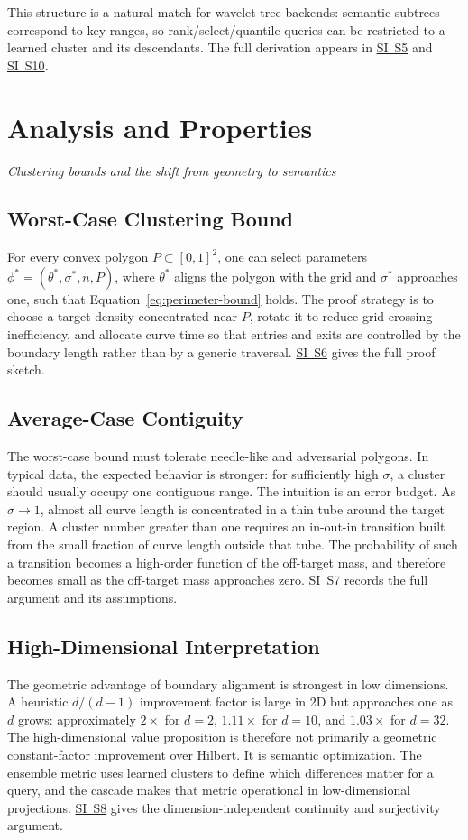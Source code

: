 \documentclass[11pt]{article}
\newcommand{\sectionsubtitle}[1]{\vspace{-0.25em}\noindent\textit{#1}\par\vspace{0.75em}}
\begin{document}
This structure is a natural match for wavelet-tree backends: semantic subtrees correspond to key ranges, so rank/select/quantile queries can be restricted to a learned cluster and its descendants. The full derivation appears in \hyperref[sec:si-composite-key]{SI~S5} and \hyperref[sec:si-wavelet]{SI~S10}.

\section{Analysis and Properties}
\label{sec:analysis}
\sectionsubtitle{Clustering bounds and the shift from geometry to semantics}

\subsection{Worst-Case Clustering Bound}
For every convex polygon $P\subset[0,1]^2$, one can select parameters $\phi^*=(\theta^*,\sigma^*,n,P)$, where $\theta^*$ aligns the polygon with the grid and $\sigma^*$ approaches one, such that Equation~\ref{eq:perimeter-bound} holds. The proof strategy is to choose a target density concentrated near $P$, rotate it to reduce grid-crossing inefficiency, and allocate curve time so that entries and exits are controlled by the boundary length rather than by a generic traversal. \hyperref[sec:si-worst-case]{SI~S6} gives the full proof sketch.

\subsection{Average-Case Contiguity}
The worst-case bound must tolerate needle-like and adversarial polygons. In typical data, the expected behavior is stronger: for sufficiently high $\sigma$, a cluster should usually occupy one contiguous range. The intuition is an error budget. As $\sigma\to1$, almost all curve length is concentrated in a thin tube around the target region. A cluster number greater than one requires an in-out-in transition built from the small fraction of curve length outside that tube. The probability of such a transition becomes a high-order function of the off-target mass, and therefore becomes small as the off-target mass approaches zero. \hyperref[sec:si-c-one]{SI~S7} records the full argument and its assumptions.

\subsection{High-Dimensional Interpretation}
The geometric advantage of boundary alignment is strongest in low dimensions. A heuristic $d/(d-1)$ improvement factor is large in 2D but approaches one as $d$ grows: approximately $2\times$ for $d=2$, $1.11\times$ for $d=10$, and $1.03\times$ for $d=32$. The high-dimensional value proposition is therefore not primarily a geometric constant-factor improvement over Hilbert. It is semantic optimization. The ensemble metric uses learned clusters to define which differences matter for a query, and the cascade makes that metric operational in low-dimensional projections. \hyperref[sec:si-dimensions]{SI~S8} gives the dimension-independent continuity and surjectivity argument.
\end{document}
